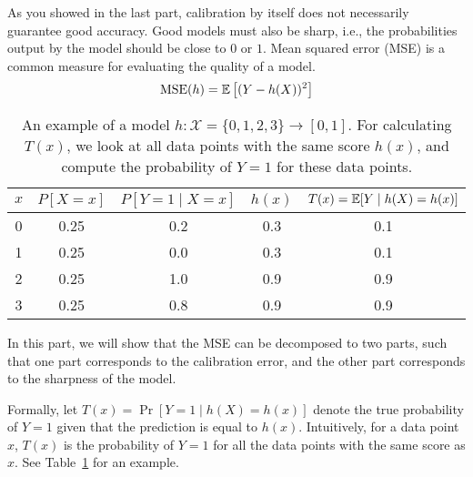 \item[(b)] 
As you showed in the last part, calibration  by  itself  does  not necessarily guarantee good accuracy. 
Good models must also be sharp, i.e., the probabilities output by the model should be close to $0$ or $1$. 
Mean squared error (MSE) is a common measure for evaluating the quality of a model.
\begin{align}
	\text{MSE}(h) = \mathbb{E} \left[(Y-h(X))^2\right]
\end{align}

\begin{table}
	\centering
	\begin{tabular}{ccccc} \toprule
		$x$&$P[X=x]$&$P[Y=1 \mid X=x]$&$h(x)$&$T(x)=\mathbb{E} [Y \mid h(X)=h(x)]$\\ \midrule
		0&0.25&0.2&0.3&0.1\\
		1&0.25&0.0&0.3&0.1\\
		2&0.25&1.0&0.9&0.9\\ 
		3&0.25&0.8&0.9&0.9\\ \bottomrule
	\end{tabular}
	\caption{\label{tab:t-example} An example of a model $h : \mathcal{X}=\{0,1,2,3\} \rightarrow [0,1]$.  
		For calculating $T(x)$, we look at all data points with the same score $h(x)$, and compute the probability of $Y=1$ for these data points.}
\end{table}



In this part, we will show that the MSE can be decomposed to two parts, such that one part corresponds to the calibration error, and the other part corresponds to the sharpness of the model.


Formally, let $T(x) = \Pr [Y =1 \mid h(X) = h(x)]$ denote the true probability of $Y=1$ given that the prediction is equal to $h(x)$.
Intuitively, for a data point $x$, $T(x)$ is the probability of $Y=1$ for all the data points with the same score as $x$. See Table~\ref{tab:t-example} for an example.

